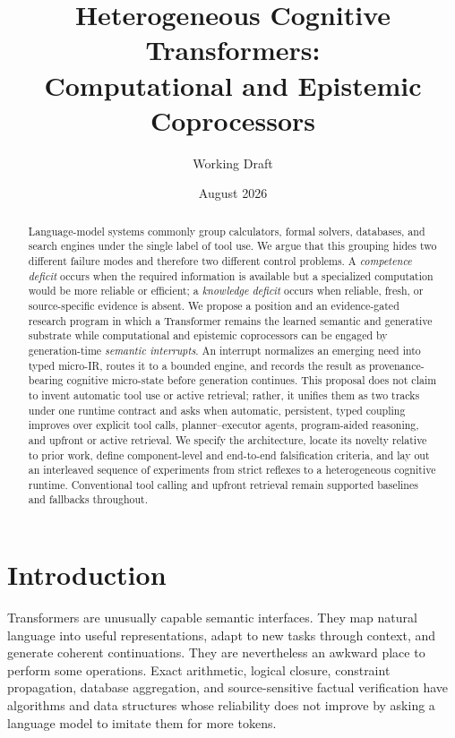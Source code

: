 \documentclass[11pt]{article}
\title{Heterogeneous Cognitive Transformers:\\
Computational and Epistemic Coprocessors}
\author{Working Draft}
\date{August 2026}
\begin{document}
\maketitle

\begin{abstract}
Language-model systems commonly group calculators, formal solvers, databases,
and search engines under the single label of tool use.  We argue that this
grouping hides two different failure modes and therefore two different control
problems.  A \emph{competence deficit} occurs when the required information is
available but a specialized computation would be more reliable or efficient; a
\emph{knowledge deficit} occurs when reliable, fresh, or source-specific
evidence is absent.  We propose a position and an evidence-gated research
program in which a Transformer remains the learned semantic and generative
substrate while computational and epistemic coprocessors can be engaged by
generation-time \emph{semantic interrupts}.  An interrupt normalizes an
emerging need into typed micro-IR, routes it to a bounded engine, and records
the result as provenance-bearing cognitive micro-state before generation
continues.  This proposal does not claim to invent automatic tool use or active
retrieval; rather, it unifies them as two tracks under one runtime contract and
asks when automatic, persistent, typed coupling improves over explicit tool
calls, planner--executor agents, program-aided reasoning, and upfront or active
retrieval.  We specify the architecture, locate its novelty relative to prior
work, define component-level and end-to-end falsification criteria, and lay out
an interleaved sequence of experiments from strict reflexes to a heterogeneous
cognitive runtime.  Conventional tool calling and upfront retrieval remain
supported baselines and fallbacks throughout.
\end{abstract}

\section{Introduction}

Transformers are unusually capable semantic interfaces.  They map natural
language into useful representations, adapt to new tasks through context, and
generate coherent continuations.  They are nevertheless an awkward place to
perform some operations.  Exact arithmetic, logical closure, constraint
propagation, database aggregation, and source-sensitive factual verification
have algorithms and data structures whose reliability does not improve by
asking a language model to imitate them for more tokens.
\end{document}

